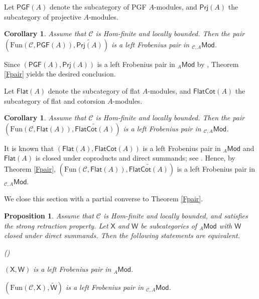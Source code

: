 \documentclass{amsart}
\theoremstyle{bfupright head,slanted body}
\theoremstyle{bfupright head,upright body}
\theoremstyle{fixed bf head,slanted body}
\newtheorem{prp}[res]{Proposition}      \newtheorem*{prp*}{Proposition}
\newtheorem{cor}[res]{Corollary}        \newtheorem*{cor*}{Corollary}
\theoremstyle{fixed bf head,upright body}
\theoremstyle{numbered paragraph}
\newlength{\thmlistleft}        %
\newlength{\thmlistright}       %
\newlength{\thmlistpartopsep}   %
\newlength{\thmlisttopsep}      %
\newlength{\thmlistparsep}      %
\newlength{\thmlistitemsep}     %
\newcounter{eqc}
\newenvironment{eqc}{\begin{list}{\upshape (\textit{\roman{eqc}})}%
		{\usecounter{eqc}%
			\setlength{\leftmargin}{\thmlistleft}%
			\setlength{\labelwidth}{\thmlistleft}%
			\setlength{\rightmargin}{\thmlistright}%
			\setlength{\partopsep}{\thmlistpartopsep}%
			\setlength{\topsep}{\thmlisttopsep}%
			\setlength{\parsep}{\thmlistparsep}%
			\setlength{\itemsep}{\thmlistitemsep}}}%
	{\end{list}}%
\newenvironment{prf*}[1][Proof]{%
	\begin{proof}[\bf #1]
		\setcounter{equation}{0}
		\renewcommand{\theequation}{\arabic{equation}}}
	{\end{proof}
}
\numberwithin{equation}{res}
\newcommand{\FC}[1]{\mathsf{FlatCot}(#1)}
\newcommand{\PGF}[1]{\mathsf{PGF}(#1)}
\newcommand{\Flat}[1]{\mathsf{Flat}(#1)}
\newcommand{\Mod}[1]{{_{#1}\mathsf{Mod}}}
\newcommand{\Prj}[1]{\mathsf{Prj}(#1)}
\newcommand{\Fun}{\mathrm{Fun}}
\newcommand{\X}{\mathsf{X}}
\newcommand{\W}{\mathsf{W}}
\newcommand{\C}{\mathcal{C}}
\begin{document}
Let $\PGF{A}$ denote the subcategory of PGF $A$-modules, and $\Prj{A}$ the subcategory of projective $A$-modules.

\begin{cor}\label{Fpair-exa}
Assume that $\C$ is Hom-finite and locally bounded. Then the pair $(\Fun(\C,\PGF{A}), \widetilde{\Prj{A}})$ is a left Frobenius pair in $\Mod{\C,A}$.
\end{cor}

\begin{prf*}
Since $(\PGF{A}, \Prj{A})$ is a left Frobenius pair in $\Mod{A}$ by \cite[Example 2.25]{LY22}, Theorem \ref{Fpair} yields the desired conclusion.
\end{prf*}

Let $\Flat{A}$ denote the subcategory of flat $A$-modules, and $\FC{A}$ the subcategory of flat and cotorsion $A$-modules.

\begin{cor}\label{Fpair-flat}
Assume that $\C$ is Hom-finite and locally bounded. Then the pair $(\Fun(\C,\Flat{A}), \widetilde{\FC{A}})$ is a left Frobenius pair in $\Mod{\C,A}$.
\end{cor}

\begin{prf*}
It is known that $(\Flat{A}, \FC{A})$ is a left Frobenius pair in $\Mod{A}$ and $\Flat{A}$ is closed under coproducts and direct summands; see \cite[Example 2.20]{LY22}. Hence, by Theorem \ref{Fpair}, $(\Fun(\C,\Flat{A}), \widetilde{\FC{A}})$ is a left Frobenius pair in $\Mod{\C,A}$.
\end{prf*}

We close this section with a partial converse to Theorem \ref{Fpair}.

\begin{prp}
Assume that $\C$ is Hom-finite and locally bounded, and satisfies the strong retraction property. Let $\X$ and $\W$ be subcategories of $\Mod{A}$ with $\W$ closed under direct summands. Then the following statements are equivalent.
\begin{eqc}
\item $(\X, \W)$ is a left Frobenius pair in $\Mod{A}$.
\item $(\Fun(\C,\X), \widetilde{\W})$ is a left Frobenius pair in $\Mod{\C,A}$.
\end{eqc}
\end{prp}
\end{document}
